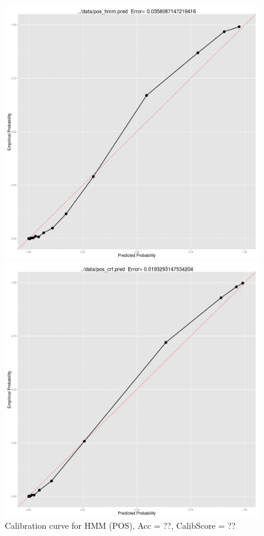 \begin{figure}[t]
  \includegraphics[width=\linewidth]{pos_hmm_pred.jpg}
  \caption{Calibration curve for HMM (POS), Acc = ??, CalibScore = ??}
  \label{fig:pos_hmm_pred}
\endminipage\hfill
{}
  \includegraphics[width=\linewidth]{pos_crf_pred.jpg}

\end{figure}
